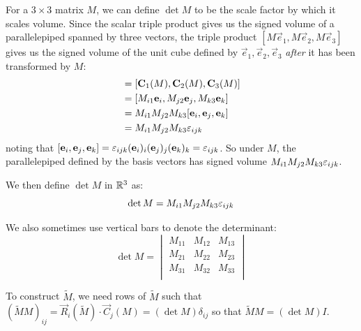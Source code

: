 \documentclass[../main.tex]{subfiles}
\begin{document}
For a $3 \times 3$ matrix $M$, we can define $\det M$ to be the scale factor by which it scales volume.
Since the scalar triple product gives us the signed volume of a parallelepiped spanned by three vectors, the triple product $[M\vec{e}_1, M\vec{e}_2, M\vec{e}_3]$ gives us the signed volume of the unit cube defined by $\vec{e}_1, \vec{e}_2, \vec{e}_3$ \textit{after} it has been transformed by $M$:
\begin{align*}
  [M\vec{e}_1, M\vec{e}_2, M\vec{e}_3] &= [\vec{C}_1(M), \vec{C}_2(M), \vec{C}_3(M)] \\
                                       &= [M_{i 1}\vec{e}_i, M_{j 2}\vec{e}_j, M_{k 3}\vec{e}_k] \\
                                       &= M_{i 1}M_{j 2}M_{k 3}[\vec{e}_i, \vec{e}_j, \vec{e}_k] \\
                                       &= M_{i 1}M_{j 2}M_{k 3} \levi_{i j k}
\end{align*}
noting that $[\mathbf{\bm{e}}_i, \mathbf{\bm{e}}_j, \mathbf{\bm{e}}_k] = \varepsilon_{i j k} (\mathbf{\bm{e}}_i)_i (\mathbf{\bm{e}}_j)_j (\mathbf{\bm{e}}_k)_k = \varepsilon_{i j k}$.
So under $M$, the parallelepiped defined by the basis vectors has signed volume $M_{i 1}M_{j 2}M_{k 3} \varepsilon_{i j k}$.

We then define $\det M$ in $\mathbb{R}^{3}$ as:
\[
  \det M = M_{i 1}M_{j 2}M_{k 3} \varepsilon_{i j k}
\]
\begin{remark}[Notation]
  We also sometimes use vertical bars to denote the determinant:
  \[
    \det M = \begin{vmatrix}
    M_{1 1} & M_{1 2} & M_{1 3} \\
    M_{2 1} & M_{2 2} & M_{2 3} \\
    M_{3 1} & M_{3 2} & M_{3 3} \\
    \end{vmatrix}
  \]
\end{remark}
To construct $\widetilde{M}$, we need rows of $\widetilde{M}$ such that $(\widetilde{M}M)_{i j} = \vec{R}_i(\widetilde{M}) \cdot \vec{C}_j(M) = (\det M) \delta_{i j}$ so that $\widetilde{M}M = (\det M)I$.
\end{document}
